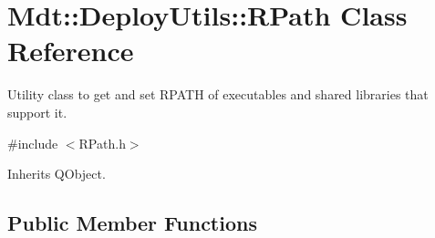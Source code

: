 \hypertarget{class_mdt_1_1_deploy_utils_1_1_r_path}{}\section{Mdt\+:\+:Deploy\+Utils\+:\+:R\+Path Class Reference}
\label{class_mdt_1_1_deploy_utils_1_1_r_path}


Utility class to get and set R\+P\+A\+TH of executables and shared libraries that support it.  




{\ttfamily \#include $<$R\+Path.\+h$>$}



Inherits Q\+Object.

\subsection*{Public Member Functions}
